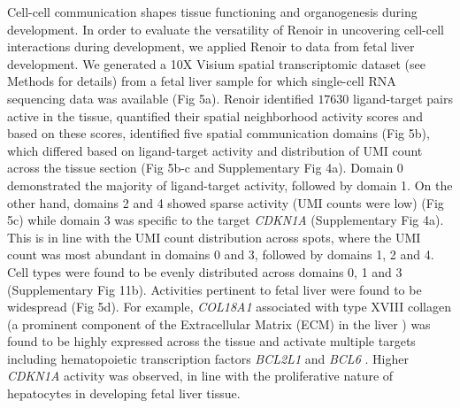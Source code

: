Cell-cell communication shapes tissue functioning and organogenesis during development. In order to evaluate the versatility of Renoir in uncovering cell-cell interactions during development, we applied Renoir to data from fetal liver development. We generated a 10X Visium spatial transcriptomic dataset (see Methods for details) from a fetal liver sample for which single-cell RNA sequencing data was available \citep{SHARMA2020377} (Fig 5a). Renoir identified $17630$ ligand-target pairs active in the tissue, quantified their spatial neighborhood activity scores and based on these scores, identified five spatial communication domains (Fig 5b), which differed based on ligand-target activity and distribution of UMI count across the tissue section (Fig 5b-c and Supplementary Fig 4a). Domain 0 demonstrated the majority of ligand-target activity, followed by domain 1. On the other hand, domains 2 and 4 showed sparse activity (UMI counts were low) (Fig 5c) while domain 3 was specific to the target \textit{CDKN1A} (Supplementary Fig 4a). This is in line with the UMI count distribution across spots, where the UMI count was most abundant in domains 0 and 3, followed by domains 1, 2 and 4. Cell types were found to be evenly distributed across domains 0, 1 and 3 (Supplementary Fig 11b). Activities pertinent to fetal liver were found to be widespread (Fig 5d). For example, \textit{COL18A1} associated with type XVIII collagen (a prominent component of the Extracellular Matrix (ECM) in the liver \citep{10.1242/dmm.011577}) was found to be highly expressed across the tissue and activate multiple targets including hematopoietic transcription factors \textit{BCL2L1} and \textit{BCL6} \citep{10.1371/journal.pone.0007641}. Higher \textit{CDKN1A} activity was observed, in line with the proliferative nature of hepatocytes in developing fetal liver tissue.\par
